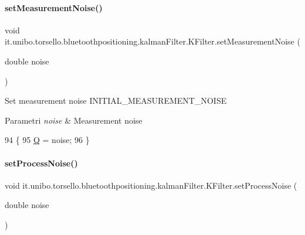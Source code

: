 \paragraph{\texorpdfstring{set\+Measurement\+Noise()}{setMeasurementNoise()}}
{\footnotesize\ttfamily void it.\+unibo.\+torsello.\+bluetoothpositioning.\+kalman\+Filter.\+K\+Filter.\+set\+Measurement\+Noise (\begin{DoxyParamCaption}\item[{double}]{noise }\end{DoxyParamCaption})}

Set measurement noise I\+N\+I\+T\+I\+A\+L\+\_\+\+M\+E\+A\+S\+U\+R\+E\+M\+E\+N\+T\+\_\+\+N\+O\+I\+SE


\begin{DoxyParams}{Parametri}
{\em noise} & Measurement noise \\
\hline
\end{DoxyParams}

\begin{DoxyCode}
94                                                   \{
95         \hyperlink{classit_1_1unibo_1_1torsello_1_1bluetoothpositioning_1_1kalmanFilter_1_1KFilter_a454b23b79e09bb12edbc9175e6ba17e9_a454b23b79e09bb12edbc9175e6ba17e9}{Q} = noise;
96     \}
\end{DoxyCode}
\hypertarget{classit_1_1unibo_1_1torsello_1_1bluetoothpositioning_1_1kalmanFilter_1_1KFilter_a7651339cfddb4cdaa1e47906b27745fc_a7651339cfddb4cdaa1e47906b27745fc}{}\label{classit_1_1unibo_1_1torsello_1_1bluetoothpositioning_1_1kalmanFilter_1_1KFilter_a7651339cfddb4cdaa1e47906b27745fc_a7651339cfddb4cdaa1e47906b27745fc} 
\paragraph{\texorpdfstring{set\+Process\+Noise()}{setProcessNoise()}}
{\footnotesize\ttfamily void it.\+unibo.\+torsello.\+bluetoothpositioning.\+kalman\+Filter.\+K\+Filter.\+set\+Process\+Noise (\begin{DoxyParamCaption}\item[{double}]{noise }\end{DoxyParamCaption})}

